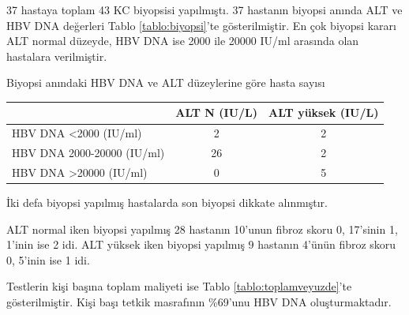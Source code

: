 37 hastaya toplam 43 KC biyopsisi yapılmıştı. 37 hastanın biyopsi anında ALT ve HBV DNA değerleri Tablo \ref{tablo:biyopsi}'te gösterilmiştir. En çok biyopsi kararı ALT normal düzeyde, HBV DNA ise 2000 ile 20000 IU/ml arasında olan hastalara verilmiştir.

\bigskip

\begin{minipage}[c]{\textwidth}
\renewcommand{\arraystretch}{1} %
\centering
\begin{threeparttable}
\caption{Biyopsi anındaki HBV DNA ve ALT düzeylerine göre hasta sayısı} \label{tablo:biyopsi} %
\begin{tabular}{lcc}
\hline
                          & ALT N (IU/L) & ALT yüksek (IU/L) \\
                          \hline
HBV DNA \textless2000 (IU/ml)     & 2     & 2          \\
HBV DNA 2000-20000  (IU/ml)       & 26    & 2          \\
HBV DNA \textgreater20000  (IU/ml) & 0     & 5 \\
\hline        
\end{tabular}
\begin{tablenotes}
\footnotesize
\item İki defa biyopsi yapılmış hastalarda son biyopsi dikkate alınmıştır.
\end{tablenotes}
\end{threeparttable}
\end{minipage}

\bigskip

ALT normal iken biyopsi yapılmış 28 hastanın 10'unun fibroz skoru 0, 17'sinin 1, 1'inin ise 2 idi. ALT yüksek iken biyopsi yapılmış 9 hastanın 4'ünün fibroz skoru 0, 5'inin ise 1 idi.






                

Testlerin kişi başına toplam maliyeti ise Tablo \ref{tablo:toplamveyuzde}'te gösterilmiştir. Kişi başı tetkik masrafının \%69'unu HBV DNA oluşturmaktadır. 

